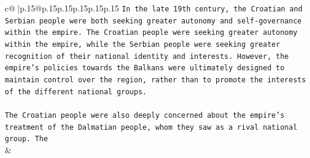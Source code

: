 \documentclass{article}
\begin{document}
{\begin{supertabular}{c@{$\;$}|p{.15\linewidth}@{}p{.15\linewidth}p{.15\linewidth}p{.15\linewidth}p{.15\linewidth}p{.15\linewidth}}
{{{\texttt{In the late 19th century, the Croatian and Serbian people were both seeking greater autonomy and self{-}governance within the empire. The Croatian people were seeking greater autonomy within the empire, while the Serbian people were seeking greater recognition of their national identity and interests. However, the empire's policies towards the Balkans were ultimately designed to maintain control over the region, rather than to promote the interests of the different national groups.} \\
\\ 
\texttt{The Croatian people were also deeply concerned about the empire's treatment of the Dalmatian people, whom they saw as a rival national group. The} \\
            }
        }
    }
    & \\ \\


\end{supertabular}}
\end{document}
